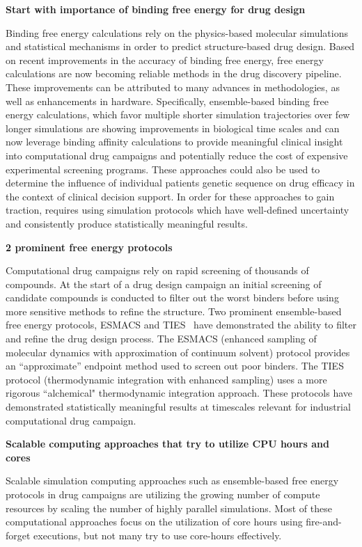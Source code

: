\textbf{Start with importance of binding free energy for drug design}

Binding free energy calculations rely on the physics-based molecular simulations 
and statistical mechanisms in order to predict structure-based drug design. 
Based on recent improvements in the accuracy of binding free energy, free energy 
calculations are now becoming reliable methods in the drug discovery pipeline. 
These improvements can be attributed to many advances in methodologies, as well 
as enhancements in hardware. Specifically, ensemble-based 
binding free energy calculations, which favor multiple shorter simulation 
trajectories over few longer simulations are showing improvements in biological 
time scales and can now leverage binding affinity calculations to provide 
meaningful clinical insight into computational drug campaigns and potentially 
reduce the cost of expensive experimental screening programs. 
These approaches could also be used to determine the influence of individual 
patients genetic sequence on drug efficacy in the context of clinical decision 
support. In order for these approaches to gain traction, requires using 
simulation protocols which have well-defined uncertainty and consistently 
produce statistically meaningful results. 

\textbf{2 prominent free energy protocols} 

Computational drug campaigns rely on rapid screening of thousands of compounds. 
At the start of a drug design campaign an initial screening of candidate 
compounds is conducted to filter out the worst binders before using more 
sensitive methods to refine the structure. Two prominent ensemble-based 
free energy protocols, ESMACS and TIES~\cite{Bhati2017} have demonstrated the 
ability to filter and refine the drug design process. The ESMACS (enhanced 
sampling of molecular dynamics with approximation of continuum solvent) protocol 
provides an ``approximate'' endpoint method used to screen out poor binders. The 
TIES protocol (thermodynamic integration with enhanced sampling) uses a more 
rigorous ``alchemical" thermodynamic integration approach. These protocols have 
demonstrated statistically meaningful results at timescales relevant for 
industrial computational drug campaign. 

\textbf{Scalable computing approaches that try to utilize CPU hours and cores}

Scalable simulation computing approaches such as ensemble-based free energy 
protocols in drug campaigns are utilizing the growing number of compute 
resources by scaling the number of highly parallel simulations. Most of these 
computational approaches focus on the utilization of core hours using 
fire-and-forget executions, but not many try to use core-hours effectively. 

